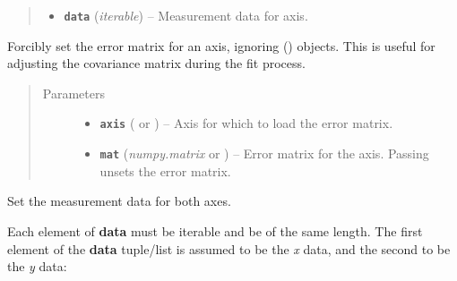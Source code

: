 \documentclass[a4paper,10pt,english]{sphinxmanual}
\begin{document}
\begin{fulllineitems}
\begin{fulllineitems}
\begin{quote}
\begin{description}
\begin{itemize}
\item {} 
\textbf{\texttt{data}} (\emph{iterable}) -- Measurement data for axis.

\end{itemize}

\end{description}\end{quote}

\end{fulllineitems}


\begin{fulllineitems}
\label{module_doc:kafe.dataset.Dataset.set_cov_mat}
Forcibly set the error matrix for an axis, ignoring {\hyperref[module_doc:kafe.dataset.ErrorSource]{\emph{}}} ()
objects. This is useful for adjusting the covariance matrix during the
fit process.
\begin{quote}\begin{description}
\item[{Parameters}] \leavevmode\begin{itemize}
\item {} 
\textbf{\texttt{axis}} ( or ) -- Axis for which to load the error matrix.

\item {} 
\textbf{\texttt{mat}} (\emph{numpy.matrix} or ) -- Error matrix for the axis. Passing  unsets the error
matrix.

\end{itemize}

\end{description}\end{quote}

\end{fulllineitems}


\begin{fulllineitems}
\label{module_doc:kafe.dataset.Dataset.set_data}
Set the measurement data for both axes.

Each element of \textbf{data} must be iterable and be of the same length.
The first element of the \textbf{data} tuple/list is assumed to be the \emph{x}
data, and the second to be the \emph{y} data:


\end{fulllineitems}
\end{fulllineitems}
\end{document}
